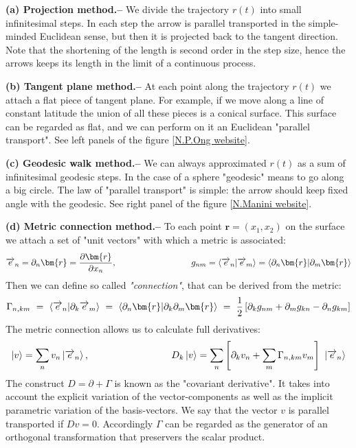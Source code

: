 \documentclass[onecolumn,fleqn]{revtex4}
\newcommand{\fracd}[2]{\frac{\partial #1}{\partial #2}}
\newcommand{\ket}[1]{\left| #1 \right\rangle}
\newcommand{\Braket}[2]{\left\langle #1 \middle| #2 \right\rangle}
\newcommand{\ora}{\protect\overrightarrow}
\newcommand{\beq}{\begin{eqnarray}}
\newcommand{\eeq}{\end{eqnarray}}
\begin{document}
{\bf (a) Projection method.-- } 
We divide the trajectory $r(t)$ into small infinitesimal steps. In each step the arrow is parallel transported in the simple-minded Euclidean sense, but then it is projected back to the tangent direction. Note that the shortening of the length is second order in the step size, hence the arrows keeps its length in the limit of a continuous process. 

{\bf (b) Tangent plane method.-- }  At each point along the trajectory ${r(t)}$ we attach a flat piece of tangent plane. For example, if we move along a line of constant latitude the union of all these pieces is a conical surface. This surface can be regarded as flat, and we can perform on it an Euclidean "parallel transport". See left panels of the figure [\href{http://www.princeton.edu/~npo/SurveyTopics/Berry_examples_files/Berryphase.html}{N.P.Ong website}].

{\bf (c) Geodesic walk method.-- } 
We can always approximated $r(t)$ as a sum of infinitesimal geodesic steps. In the case of a sphere "geodesic" means to go along a big circle. The law of "parallel transport" is simple: the arrow should keep fixed angle with the geodesic. See right panel of the figure [\href{http://www.mi.infm.it/manini/berryphase.html}{N.Manini website}].

{\bf (d) Metric connection method.-- }  
To each point ${\bm{r}=(x_1,x_2)}$ on the surface we attach a set of "unit vectors" with which a metric is associated:
\beq
\ora{e}_n = \partial_n \bm{r} = \fracd{\bm{r}}{x_n}, 
\hspace*{3cm}
g_{nm} = \Braket{\ora{e}_n}{\ora{e}_m} =  \Braket{\partial_n \bm{r}}{\partial_m \bm{r}}  
\eeq 
Then we can define so called {\em "connection"}, that can be derived from the metric:  
\beq
\Gamma_{n,km} \ = \  \Braket{\ora{e}_n}{\partial_k \ora{e}_m} 
\ = \ \Braket{\partial_n \bm{r}}{ \partial_k \partial_m\bm{r}}
\ = \ \frac{1}{2}\left[\partial_k g_{nm} + \partial_m g_{kn} - \partial_n g_{km} \right]
\eeq
The metric connection allows us to calculate full derivatives: 
\beq
\ket{v} = \sum_n v_n \ket{\ora{e}_n}, 
\hspace*{3cm}
D_k\ket{v} = \sum_n  \left[ \partial_k v_n + \sum_{m} \Gamma_{n,km}v_m \right] \ \ket{\ora{e}_n} 
\eeq   
The construct ${D=\partial + \Gamma}$ is known as the "covariant derivative". 
It takes into account the explicit variation of the vector-components 
as well as the implicit parametric variation of the basis-vectors. 
We say that the vector $v$ is parallel transported if ${Dv=0}$.  
Accordingly $\Gamma$ can be regarded as the generator of an orthogonal transformation
that preservers the scalar product. 
\end{document}
